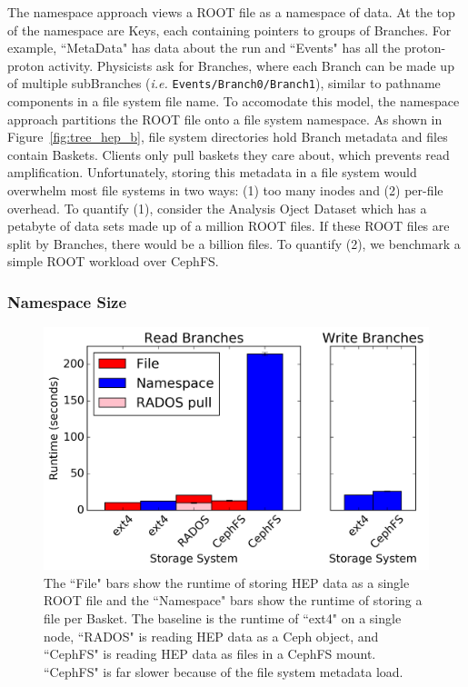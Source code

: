 The namespace approach views a ROOT file as a namespace of data. At the top of
the namespace are Keys, each containing pointers to groups of Branches. For
example, ``MetaData" has data about the run and ``Events" has all the
proton-proton activity. Physicists ask for Branches, where each Branch can be
made up of multiple subBranches ({\it i.e.} \texttt{Events/Branch0/Branch1}),
similar to pathname components in a file system file name.  To accomodate this
model, the namespace approach partitions the ROOT file onto a file system
namespace.  As shown in Figure~\ref{fig:tree_hep_b}, file system directories
hold Branch metadata and files contain Baskets. Clients only pull baskets
they care about, which prevents read amplification.  Unfortunately, storing
this metadata in a file system would overwhelm most file systems in two ways:
(1) too many inodes and (2) per-file overhead.  To quantify (1), consider the
Analysis Oject Dataset which has a petabyte of data sets made up of a million
ROOT files. If these ROOT files are split by Branches, there would be a billion
files. To quantify (2), we benchmark a simple ROOT workload over CephFS.


\subsubsection{Namespace Size}

\begin{figure}[tb]
\centering
  \includegraphics[width=1\linewidth]{figures/hep_runtime.png}
  \caption{The ``File" bars show the runtime of storing HEP data as a single
ROOT file and the ``Namespace" bars show the runtime of storing a file per
Basket. The baseline is the runtime of ``ext4" on a single node, ``RADOS" is
reading HEP data as a Ceph object, and ``CephFS" is reading HEP data as files
in a CephFS mount. ``CephFS" is far slower because of the file system metadata
load.}
  \label{fig:hep_runtime}
\end{figure}

